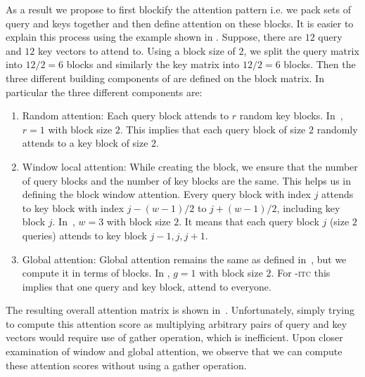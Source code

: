 As a result we propose to first blockify the attention pattern i.e. we pack sets of query and keys together and then define attention on these blocks. 
It is easier to explain this process using the example 
shown in . Suppose, there are $12$ query and $12$ key vectors to attend to. Using a block size of $2$, we split the query matrix into $12/2 = 6$ blocks and similarly the key matrix into $12/2 = 6$ blocks. Then the three different building components of \bigb are defined on the block matrix. In particular the three different components are:
\begin{enumerate}
    \item Random attention: Each query block attends to $r$ random key blocks. In~, $r=1$ with block size $2$. This implies that each query block of size $2$ randomly attends to a key block of size $2$. 
    \item Window local attention: While creating the block, we ensure that the number of query blocks and the number of key blocks are the same. This helps us in defining the block window attention. Every query block with index $j$ attends to key block with index $j - (w-1)/2$ to $j + (w-1)/2$, including key block $j$. In~, $w=3$ with block size $2$. It means that each query block $j$ (size $2$ queries) attends to key block $j-1, j, j+1$.
    \item Global attention: Global attention remains the same as defined in~, but we compute it in terms of blocks. In , $g=1$ with block size $2$. For \bigb-\textsc{itc} this implies that one query and key block, attend to everyone. 
\end{enumerate}
The resulting overall attention matrix is shown in~.
Unfortunately, simply trying to compute this attention score as multiplying arbitrary pairs of query and key vectors would require use of gather operation, which is inefficient. 
Upon closer examination of window and global attention, we observe that we can compute these attention scores without using a gather operation. 
